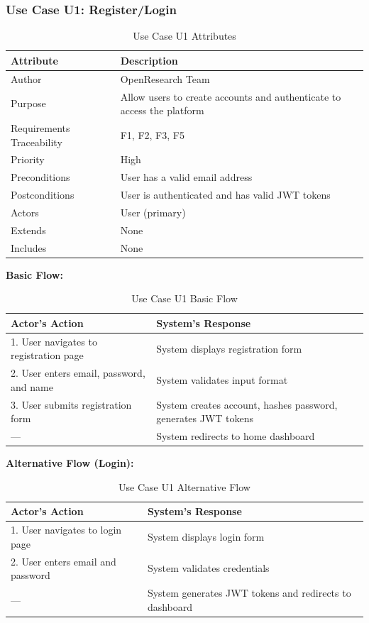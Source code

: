 \documentclass[11pt,a4paper]{article}
\begin{document}
\subsubsection{Use Case U1: Register/Login}

\begin{table}[H]
\centering
\begin{tabular}{p{4cm}p{9cm}}
\toprule
\textbf{Attribute} & \textbf{Description} \\
\midrule
Author & OpenResearch Team \\
Purpose & Allow users to create accounts and authenticate to access the platform \\
Requirements Traceability & F1, F2, F3, F5 \\
Priority & High \\
Preconditions & User has a valid email address \\
Postconditions & User is authenticated and has valid JWT tokens \\
Actors & User (primary) \\
Extends & None \\
Includes & None \\
\bottomrule
\end{tabular}
\caption{Use Case U1 Attributes}
\end{table}

\textbf{Basic Flow:}

\begin{table}[H]
\centering
\begin{tabular}{p{6cm}p{7cm}}
\toprule
\textbf{Actor's Action} & \textbf{System's Response} \\
\midrule
1. User navigates to registration page & System displays registration form \\
2. User enters email, password, and name & System validates input format \\
3. User submits registration form & System creates account, hashes password, generates JWT tokens \\
--- & System redirects to home dashboard \\
\bottomrule
\end{tabular}
\caption{Use Case U1 Basic Flow}
\end{table}

\textbf{Alternative Flow (Login):}

\begin{table}[H]
\centering
\begin{tabular}{p{6cm}p{7cm}}
\toprule
\textbf{Actor's Action} & \textbf{System's Response} \\
\midrule
1. User navigates to login page & System displays login form \\
2. User enters email and password & System validates credentials \\
--- & System generates JWT tokens and redirects to dashboard \\
\bottomrule
\end{tabular}
\caption{Use Case U1 Alternative Flow}
\end{table}
\end{document}

